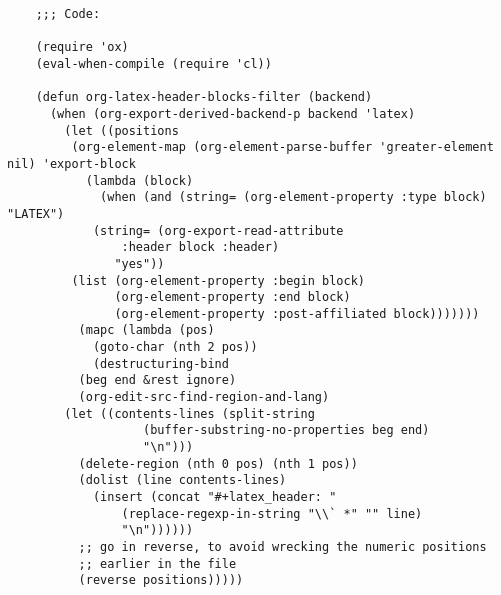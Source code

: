 \documentclass[11pt]{article}
\begin{document}
\begin{verbatim}
    ;;; Code:

    (require 'ox)
    (eval-when-compile (require 'cl))

    (defun org-latex-header-blocks-filter (backend)
      (when (org-export-derived-backend-p backend 'latex)
        (let ((positions
         (org-element-map (org-element-parse-buffer 'greater-element nil) 'export-block
           (lambda (block)
             (when (and (string= (org-element-property :type block) "LATEX")
            (string= (org-export-read-attribute
                :header block :header)
               "yes"))
         (list (org-element-property :begin block)
               (org-element-property :end block)
               (org-element-property :post-affiliated block)))))))
          (mapc (lambda (pos)
            (goto-char (nth 2 pos))
            (destructuring-bind
          (beg end &rest ignore)
          (org-edit-src-find-region-and-lang)
        (let ((contents-lines (split-string
                   (buffer-substring-no-properties beg end)
                   "\n")))
          (delete-region (nth 0 pos) (nth 1 pos))
          (dolist (line contents-lines)
            (insert (concat "#+latex_header: "
                (replace-regexp-in-string "\\` *" "" line)
                "\n"))))))
          ;; go in reverse, to avoid wrecking the numeric positions
          ;; earlier in the file
          (reverse positions)))))



\end{verbatim}
\end{document}
